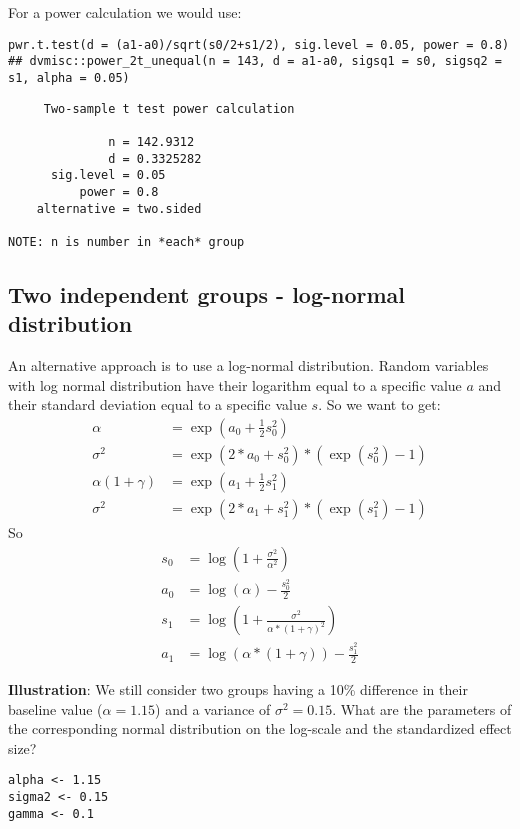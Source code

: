 \documentclass[12pt]{article}
\begin{document}
For a power calculation we would use:
\lstset{language=r,label= ,caption= ,captionpos=b,numbers=none}
\begin{lstlisting}
pwr.t.test(d = (a1-a0)/sqrt(s0/2+s1/2), sig.level = 0.05, power = 0.8)
## dvmisc::power_2t_unequal(n = 143, d = a1-a0, sigsq1 = s0, sigsq2 = s1, alpha = 0.05)
\end{lstlisting}

\begin{verbatim}
     Two-sample t test power calculation 

              n = 142.9312
              d = 0.3325282
      sig.level = 0.05
          power = 0.8
    alternative = two.sided

NOTE: n is number in *each* group
\end{verbatim}

\subsection{Two independent groups - log-normal distribution}
\label{sec:orgcd77fca}

An alternative approach is to use a log-normal distribution. Random
variables with log normal distribution have their logarithm equal to a
specific value \(a\) and their standard deviation equal to a specific
value \(s\). So we want to get:
\begin{align*}
\alpha &= \exp(a_0 + \frac{1}{2} s_0^2) \\
\sigma^2 &= \exp(2*a_0 + s_0^2)*(\exp(s_0^2)-1) \\
\alpha (1+\gamma) &= \exp(a_1 + \frac{1}{2} s_1^2) \\
\sigma^2 &= \exp(2*a_1 + s_1^2)*(\exp(s_1^2)-1)
\end{align*}
So
\begin{align*}
s_0 &= \log\left(1+\frac{\sigma^2}{\alpha^2}\right)\\
a_0 &= \log(\alpha)-\frac{s_0^2}{2}\\
s_1 &= \log\left(1+\frac{\sigma^2}{\alpha*(1+\gamma)^2}\right)\\
a_1 &= \log(\alpha*(1+\gamma))-\frac{s_1^2}{2}
\end{align*}

\clearpage

\textbf{Illustration}: We still consider two groups having a 10\%
difference in their baseline value (\(\alpha=1.15\)) and a variance of
\(\sigma^2 = 0.15\). What are the parameters of the corresponding
normal distribution on the log-scale and the standardized effect size?
\lstset{language=r,label= ,caption= ,captionpos=b,numbers=none}
\begin{lstlisting}
alpha <- 1.15
sigma2 <- 0.15
gamma <- 0.1
\end{lstlisting}
\end{document}
